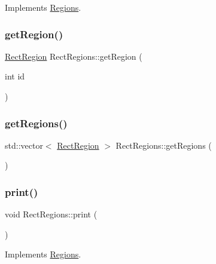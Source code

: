 Implements \hyperlink{struct_regions_ae2bcea2b1c245a9d1ab1ff3abc23f2a0}{Regions}.

\mbox{\label{struct_rect_regions_a4bbad55e0b6f3a8ece1d76402f16bfc2}} 
\subsubsection{\texorpdfstring{get\+Region()}{getRegion()}}
{\footnotesize\ttfamily \hyperlink{struct_rect_region}{Rect\+Region} Rect\+Regions\+::get\+Region (\begin{DoxyParamCaption}\item[{int}]{id }\end{DoxyParamCaption})}

\mbox{\label{struct_rect_regions_ab1d9ba6a6a0087fd2db278a22162c63a}} 
\subsubsection{\texorpdfstring{get\+Regions()}{getRegions()}}
{\footnotesize\ttfamily std\+::vector$<$ \hyperlink{struct_rect_region}{Rect\+Region} $>$ Rect\+Regions\+::get\+Regions (\begin{DoxyParamCaption}{ }\end{DoxyParamCaption})}

\mbox{\label{struct_rect_regions_a6ce45dd2b9d9f0f3424d4c6d656652c2}} 
\subsubsection{\texorpdfstring{print()}{print()}}
{\footnotesize\ttfamily void Rect\+Regions\+::print (\begin{DoxyParamCaption}{ }\end{DoxyParamCaption})\hspace{0.3cm}{\ttfamily [virtual]}}



Implements \hyperlink{struct_regions_a5a19f40bc0d2226f244625b88fbf8e59}{Regions}.

